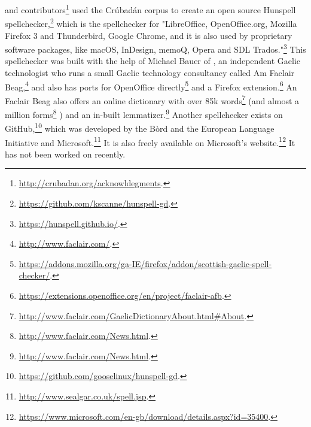 \citet{scannell2007crubadan} and contributors\footnote{\href{http://crubadan.org/acknowldegments}{http://crubadan.org/acknowldegments}. } used the Cr\'ubad\'an corpus to create an open source Hunspell spellchecker,\footnote{\href{https://github.com/kscanne/hunspell-gd}{https://github.com/kscanne/hunspell-gd}. } which is the spellchecker for "LibreOffice, OpenOffice.org, Mozilla Firefox 3 and Thunderbird, Google Chrome, and it is also used by proprietary software packages, like macOS, InDesign, memoQ, Opera and SDL Trados."\footnote{\href{https://hunspell.github.io/}{https://hunspell.github.io/}. } This spellchecker was built with the help of Michael Bauer of \citet{bauer2014salt}, an independent Gaelic technologist who runs a small Gaelic technology consultancy called Am Faclair Beag,\footnote{\href{http://www.faclair.com/}{http://www.faclair.com/}. } and also has ports for OpenOffice directly\footnote{\href{https://addons.mozilla.org/ga-IE/firefox/addon/scottish-gaelic-spell-checker/}{https://addons.mozilla.org/ga-IE/firefox/addon/scottish-gaelic-spell-checker/}. } and a Firefox extension.\footnote{\href{https://extensions.openoffice.org/en/project/faclair-afb}{https://extensions.openoffice.org/en/project/faclair-afb}. } An Faclair Beag also offers an online dictionary with over 85k words\footnote{\href{http://www.faclair.com/GaelicDictionaryAbout.html\#About}{http://www.faclair.com/GaelicDictionaryAbout.html\#About}. }
(and almost a million forms\footnote{\href{http://www.faclair.com/News.html}{http://www.faclair.com/News.html}. } \citep{bauer2014salt}) and an in-built lemmatizer.\footnote{\href{http://www.faclair.com/News.html}{http://www.faclair.com/News.html}. } Another spellchecker exists on GitHub,\footnote{\href{https://github.com/gooselinux/hunspell-gd}{https://github.com/gooselinux/hunspell-gd}. } which was developed by the B\`ord and the European Language Initiative and Microsoft.\footnote{\href{http://www.sealgar.co.uk/spell.jsp}{http://www.sealgar.co.uk/spell.jsp}. } It is also freely available on Microsoft's website.\footnote{\href{https://www.microsoft.com/en-gb/download/details.aspx?id=35400}{https://www.microsoft.com/en-gb/download/details.aspx?id=35400}. } It has not been worked on recently.

